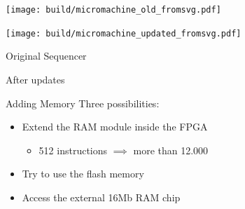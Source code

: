 \documentclass{beamer}
\begin{document}
      \begin{landscape}
        \begin{frame}[plain]
            \texttt{[image: build/micromachine\_old\_fromsvg.pdf]}

        \end{frame}
        \begin{frame}[plain]
            \texttt{[image: build/micromachine\_updated\_fromsvg.pdf]}

        \end{frame}
      \end{landscape}

      \begin{frame}{Original Sequencer}
          \begin{figure}
            \centering
          \end{figure}
      \end{frame}

      \begin{frame}{After updates}
        \begin{figure}
          \centering
        \end{figure}
      \end{frame}

      \begin{frame}{Adding Memory}
          Three possibilities:
          \begin{itemize}
            \item Extend the RAM module inside the FPGA
                \begin{itemize}
                  \item 512 instructions $\implies$ more than 12.000
                \end{itemize}
            \pause
            \item Try to use the flash memory
            \pause
            \item Access the external 16Mb RAM chip
        \end{itemize}

      \end{frame}
\end{document}
